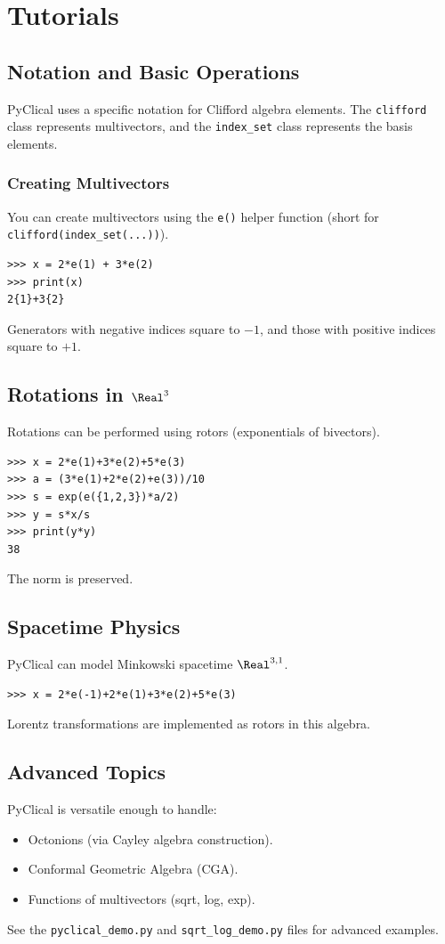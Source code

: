 \chapter{Tutorials}
\label{ch:tutorials_pyclical}

\section{Notation and Basic Operations}
PyClical uses a specific notation for Clifford algebra elements.
The \texttt{clifford} class represents multivectors, and the \texttt{index\_set} class represents the basis elements.

\subsection{Creating Multivectors}
You can create multivectors using the \texttt{e()} helper function (short for \texttt{clifford(index\_set(...))}).
\begin{verbatim}
>>> x = 2*e(1) + 3*e(2)
>>> print(x)
2{1}+3{2}
\end{verbatim}
Generators with negative indices square to $-1$, and those with positive indices square to $+1$.

\section{Rotations in $\Real^3$}
Rotations can be performed using rotors (exponentials of bivectors).
\begin{verbatim}
>>> x = 2*e(1)+3*e(2)+5*e(3)
>>> a = (3*e(1)+2*e(2)+e(3))/10
>>> s = exp(e({1,2,3})*a/2)
>>> y = s*x/s
>>> print(y*y)
38
\end{verbatim}
The norm is preserved.

\section{Spacetime Physics}
PyClical can model Minkowski spacetime $\Real^{3,1}$.
\begin{verbatim}
>>> x = 2*e(-1)+2*e(1)+3*e(2)+5*e(3)
\end{verbatim}
Lorentz transformations are implemented as rotors in this algebra.

\section{Advanced Topics}
PyClical is versatile enough to handle:
\begin{itemize}
    \item Octonions (via Cayley algebra construction).
    \item Conformal Geometric Algebra (CGA).
    \item Functions of multivectors (sqrt, log, exp).
\end{itemize}
See the \texttt{pyclical\_demo.py} and \texttt{sqrt\_log\_demo.py} files for advanced examples.
